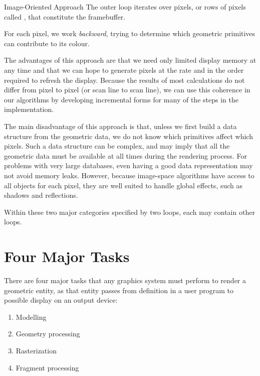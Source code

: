 \documentclass[../COS3712_Notes.tex]{subfiles}
\begin{document}
      \begin{definition}{Image-Oriented Approach}
        The outer loop iterates over pixels, or rows of pixels called ,
        that constitute the framebuffer.

        For each pixel, we work \emph{backward}, trying to determine which geometric primitives
        can contribute to its colour.

        The advantages of this approach are that we need only limited display memory
        at any time and that we can hope to generate pixels
        at the rate and in the order required to refresh the display.
        Because the results of most calculations do not differ from pixel to pixel
        (or scan line to scan line),
        we can use this coherence in our algorithms by developing incremental forms
        for many of the steps in the implementation.

        The main disadvantage of this approach is that, unless we first build a data structure
        from the geometric data, we do not know which primitives affect which pixels.
        Such a data structure can be complex, and may imply that all the geometric data
        must be available at all times during the rendering process.
        For problems with very large databases, even having a good data representation
        may not avoid memory leaks.
        However, because image-space algorithms have access to all objects for each pixel,
        they are well suited to handle global effects, such as shadows and reflections.
      \end{definition}

      Within these two major categories specified by two loops, each may contain other loops.

    \section{Four Major Tasks}
      There are four major tasks that any graphics system must perform to render a geometric
      entity, as that entity passes from definition in a user program to possible display
      on an output device:
      \begin{enumerate}[nosep]
        \item Modelling
        \item Geometry processing
        \item Rasterization
        \item Fragment processing
      \end{enumerate}
\end{document}
